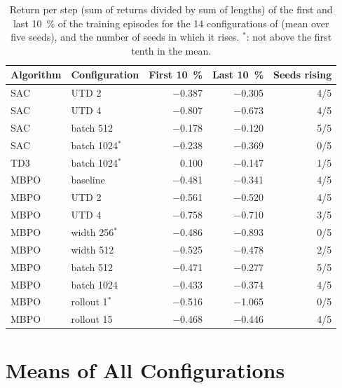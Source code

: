 \begin{table}[tb]
  \centering
  \caption{Return per step (sum of returns divided by sum of lengths) of the first and last \SI{10}{\percent} of the training episodes for the \num{14} configurations of  (mean over five seeds), and the number of seeds in which it rises.
    $^\ast$: not above the first tenth in the mean.}
  \label{tab:app-learning-perstep}
  \small
  \begin{tabular}{llrrr}
    \toprule
    Algorithm & Configuration & First \SI{10}{\percent} & Last \SI{10}{\percent} & Seeds rising \\
    \midrule
    SAC & UTD 2 & \num{-0.387} & \num{-0.305} & \num{4}/\num{5} \\
    SAC & UTD 4 & \num{-0.807} & \num{-0.673} & \num{4}/\num{5} \\
    SAC & batch 512 & \num{-0.178} & \num{-0.120} & \num{5}/\num{5} \\
    SAC & batch 1024$^\ast$ & \num{-0.238} & \num{-0.369} & \num{0}/\num{5} \\
    TD3 & batch 1024$^\ast$ & \num{0.100} & \num{-0.147} & \num{1}/\num{5} \\
    MBPO & baseline & \num{-0.481} & \num{-0.341} & \num{4}/\num{5} \\
    MBPO & UTD 2 & \num{-0.561} & \num{-0.520} & \num{4}/\num{5} \\
    MBPO & UTD 4 & \num{-0.758} & \num{-0.710} & \num{3}/\num{5} \\
    MBPO & width 256$^\ast$ & \num{-0.486} & \num{-0.893} & \num{0}/\num{5} \\
    MBPO & width 512 & \num{-0.525} & \num{-0.478} & \num{2}/\num{5} \\
    MBPO & batch 512 & \num{-0.471} & \num{-0.277} & \num{5}/\num{5} \\
    MBPO & batch 1024 & \num{-0.433} & \num{-0.374} & \num{4}/\num{5} \\
    MBPO & rollout 1$^\ast$ & \num{-0.516} & \num{-1.065} & \num{0}/\num{5} \\
    MBPO & rollout 15 & \num{-0.468} & \num{-0.446} & \num{4}/\num{5} \\
    \bottomrule
  \end{tabular}
\end{table}

\section{Means of All Configurations}\label{sec:app-learn-means}

